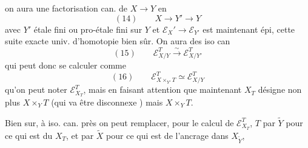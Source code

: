 

on aura une factorisation can. de
$X\longrightarrow Y$ en
\[
(14)\qquad X\longrightarrow Y'\longrightarrow Y
\]
avec $Y'$ étale fini ou pro-étale fini sur $Y$
et $\mathcal E_X'\longrightarrow\mathcal E_{Y'}$ est maintenant épi,
 cette suite exacte univ. d'homotopie
bien sûr. On aura des iso can
\[
(15)\qquad \mathcal E_{X/Y}^T\xrightarrow{\sim}\mathcal E_{X/Y'}^T
\]
qui peut donc se calculer comme
\[
(16)\qquad \mathcal E_{X\times_{Y'}T}^T\simeq\mathcal E_{X/Y}^T
\]
qu'on peut noter $\mathcal E_{X_T}^T$, mais en
faisant attention que maintenant
$X_T$ désigne non plus $X\times_YT$ (qui
va être disconnexe ) mais $X\times_YT$.

Bien sur, à iso. can. près on peut
 remplacer, pour le calcul de $\mathcal E_{X_T}^T$,
$T$ par $\widetilde Y$ pour ce qui est du $X_T$, et par
$\widetilde X$ pour ce qui est de l'ancrage dans $X_{\widetilde Y}$,

